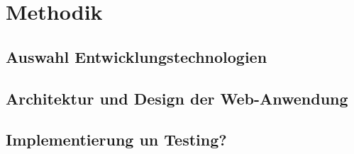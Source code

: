 \chapter{Methodik}

\section{Auswahl Entwicklungstechnologien}

\section{Architektur und Design der Web-Anwendung}

\section{Implementierung un Testing?}